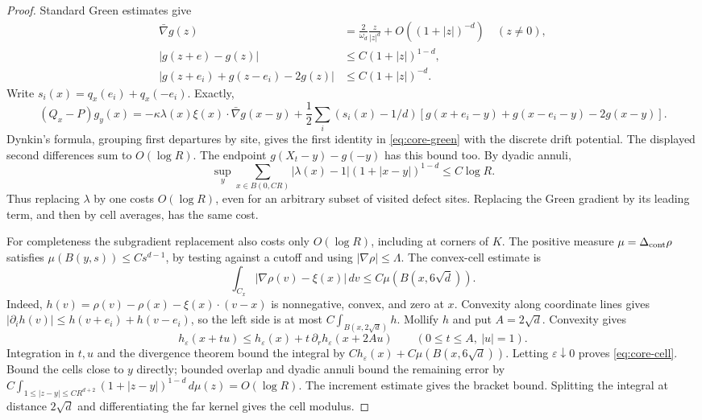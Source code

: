 \begin{proof}
Standard Green estimates \citep{LawlerLimic2010} give
\begin{align*}
 \bar\nabla g(z)&=\frac2{\omega_d}\frac z{|z|^d}+O((1+|z|)^{-d})
 \quad(z\ne0),\\
 |g(z+e)-g(z)|&\leq C(1+|z|)^{1-d},\\
 |g(z+e_i)+g(z-e_i)-2g(z)|&\leq C(1+|z|)^{-d}.
\end{align*}
Write $s_i(x)=q_x(e_i)+q_x(-e_i)$. Exactly,
\[
 (Q_x-P)g_y(x)=-\kappa\lambda(x)\xi(x)\cdot\bar\nabla g(x-y)
 +\frac12\sum_i(s_i(x)-1/d)
 [g(x+e_i-y)+g(x-e_i-y)-2g(x-y)].
\]
Dynkin's formula, grouping first departures by site, gives the first
identity in \eqref{eq:core-green} with the discrete drift potential.
The displayed second differences sum to $O(\log R)$. The endpoint
$g(X_t-y)-g(-y)$ has this bound too. By dyadic annuli,
\begin{equation}\label{eq:core-defect-potential}
 \sup_y\sum_{x\in B(0,CR)}
 |\lambda(x)-1|(1+|x-y|)^{1-d}\leq C\log R.
\end{equation}
Thus replacing $\lambda$ by one costs $O(\log R)$, even for an arbitrary
subset of visited defect sites. Replacing the Green gradient by its
leading term, and then by cell averages, has the same cost.

For completeness the subgradient replacement also costs only $O(\log R)$,
including at corners of $K$. The positive measure $\mu=\Delta_{\rm cont}\rho$
satisfies $\mu(B(y,s))\leq Cs^{d-1}$, by testing against a cutoff and using
$|\nabla\rho|\leq\Lambda$. The convex-cell estimate is
\begin{equation}\label{eq:core-cell}
 \int_{C_x}|\nabla\rho(v)-\xi(x)|\,dv
 \leq C\mu(B(x,6\sqrt d)).
\end{equation}
Indeed, $h(v)=\rho(v)-\rho(x)-\xi(x)\cdot(v-x)$ is nonnegative, convex,
and zero at $x$. Convexity along coordinate lines gives
$|\partial_i h(v)|\leq h(v+e_i)+h(v-e_i)$, so the left side is at most
$C\int_{B(x,2\sqrt d)}h$. Mollify $h$ and put $A=2\sqrt d$. Convexity gives
\[
 h_\varepsilon(x+tu)\le h_\varepsilon(x)
       +t\,\partial_r h_\varepsilon(x+2Au)
       \qquad(0\le t\le A,\ |u|=1).
\]
Integration in $t,u$ and the divergence theorem bound the integral by
$C h_\varepsilon(x)+C\mu(B(x,6\sqrt d))$.
Letting $\varepsilon\downarrow0$ proves \eqref{eq:core-cell}.
Bound the cells close to $y$ directly; bounded overlap and dyadic annuli
bound the remaining error by
$C\int_{1\leq|z-y|\leq CR^{d+2}}(1+|z-y|)^{1-d}\,d\mu(z)=O(\log R)$.
The increment estimate gives the bracket bound. Splitting the integral
at distance $2\sqrt d$ and differentiating the far kernel gives the
cell modulus.
\end{proof}

